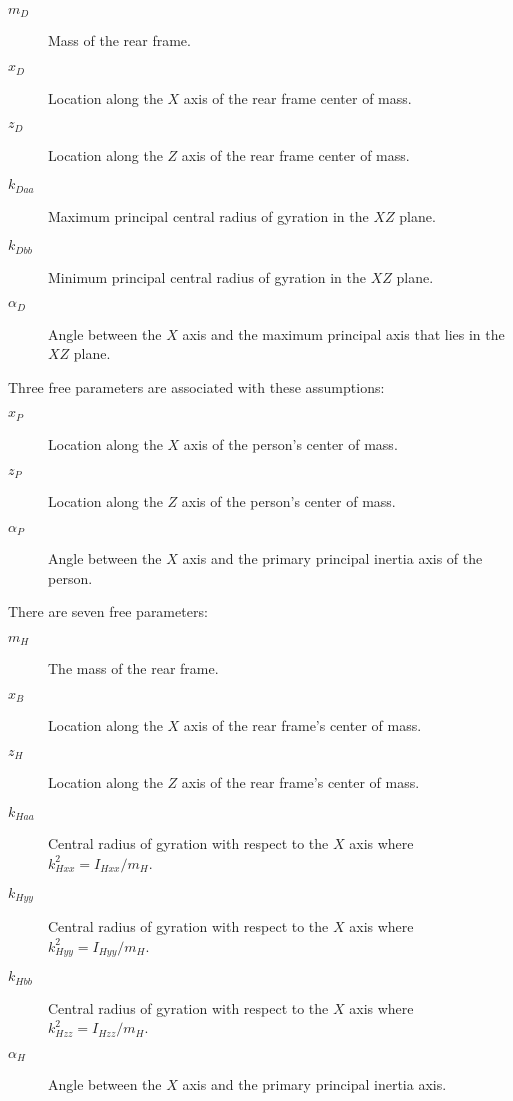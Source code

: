 \documentclass{bmd2019a}
\begin{document}
\begin{description}
  \item[$m_D$] Mass of the rear frame.
  \item[$x_D$] Location along the $X$ axis of the rear frame center of mass.
  \item[$z_D$] Location along the $Z$ axis of the rear frame center of mass.
  \item[$k_{Daa}$] Maximum principal central radius of gyration in the $XZ$
    plane.
  \item[$k_{Dbb}$] Minimum principal central radius of gyration in the $XZ$
    plane.
  \item[$\alpha_D$] Angle between the $X$ axis and the maximum principal axis
    that lies in the $XZ$ plane.
\end{description}
 Three free parameters
are associated with these assumptions:

\begin{description}
  \item[$x_P$] Location along the $X$ axis of the person's center of mass.
  \item[$z_P$] Location along the $Z$ axis of the person's center of mass.
  \item[$\alpha_P$] Angle between the $X$ axis and the primary principal
    inertia axis of the person.
\end{description}

There are seven free parameters:

\begin{description}
  \item[$m_H$] The mass of the rear frame.
  \item[$x_B$] Location along the $X$ axis of the rear frame's center of mass.
  \item[$z_H$] Location along the $Z$ axis of the rear frame's center of mass.
  \item[$k_{Haa}$] Central radius of gyration with respect to the $X$ axis
    where $k_{Hxx}^2=I_{Hxx} / m_H$.
  \item[$k_{Hyy}$] Central radius of gyration with respect to the $X$ axis
    where $k_{Hyy}^2=I_{Hyy} / m_H$.
  \item[$k_{Hbb}$] Central radius of gyration with respect to the $X$ axis
    where $k_{Hzz}^2=I_{Hzz} / m_H$.
  \item[$\alpha_H$] Angle between the $X$ axis and the primary principal
    inertia axis.
\end{description}
\end{document}
